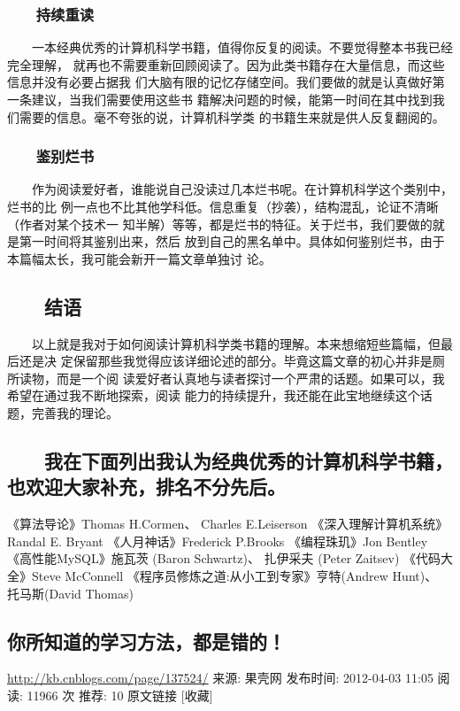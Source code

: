\documentclass[11pt]{ctexart}
\begin{document}
{{{{\subsubsection{　　持续重读}
\label{sec:orgf5d22a8}
　　一本经典优秀的计算机科学书籍，值得你反复的阅读。不要觉得整本书我已经完全理解，
就再也不需要重新回顾阅读了。因为此类书籍存在大量信息，而这些信息并没有必要占据我
们大脑有限的记忆存储空间。我们要做的就是认真做好第一条建议，当我们需要使用这些书
籍解决问题的时候，能第一时间在其中找到我们需要的信息。毫不夸张的说，计算机科学类
的书籍生来就是供人反复翻阅的。
\subsubsection{　　鉴别烂书}
\label{sec:orgc4fa90e}
　　作为阅读爱好者，谁能说自己没读过几本烂书呢。在计算机科学这个类别中，烂书的比
例一点也不比其他学科低。信息重复（抄袭），结构混乱，论证不清晰（作者对某个技术一
知半解）等等，都是烂书的特征。关于烂书，我们要做的就是第一时间将其鉴别出来，然后
放到自己的黑名单中。具体如何鉴别烂书，由于本篇幅太长，我可能会新开一篇文章单独讨
论。
\subsection{　　结语}
\label{sec:org228dc7b}

　　以上就是我对于如何阅读计算机科学类书籍的理解。本来想缩短些篇幅，但最后还是决
定保留那些我觉得应该详细论述的部分。毕竟这篇文章的初心并非是厕所读物，而是一个阅
读爱好者认真地与读者探讨一个严肃的话题。如果可以，我希望在通过我不断地探索，阅读
能力的持续提升，我还能在此宝地继续这个话题，完善我的理论。
\subsection{　　我在下面列出我认为经典优秀的计算机科学书籍，也欢迎大家补充，排名不分先后。}
\label{sec:org2efb479}
《算法导论》Thomas H.Cormen、 Charles E.Leiserson
《深入理解计算机系统》Randal E. Bryant
《人月神话》Frederick P.Brooks
《编程珠玑》Jon Bentley
《高性能MySQL》施瓦茨 (Baron Schwartz)、 扎伊采夫 (Peter Zaitsev)
《代码大全》Steve McConnell
《程序员修炼之道:从小工到专家》亨特(Andrew Hunt)、 托马斯(David Thomas)
\subsection{你所知道的学习方法，都是错的！}
\label{sec:orgf17991d}
\url{http://kb.cnblogs.com/page/137524/}
来源: 果壳网  发布时间: 2012-04-03 11:05  阅读: 11966 次  推荐: 10   原文链接
[收藏]

}}}}
\end{document}
